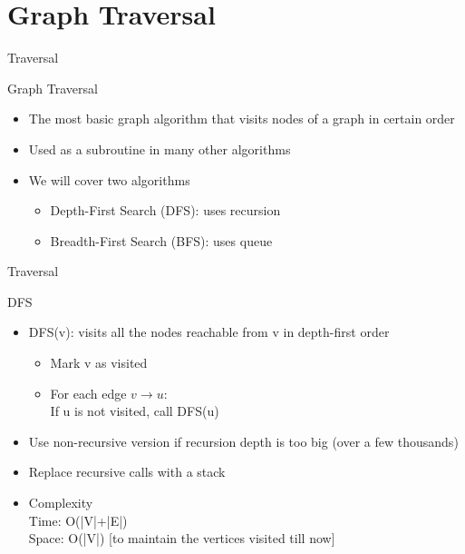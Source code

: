 \documentclass{beamer}
\begin{document}
\section{Graph Traversal}
\begin{frame}[<+->]{Traversal}
\begin{block}{Graph Traversal}
  \begin{itemize}
    \item The most basic graph algorithm that visits nodes of a graph in certain order
    \item Used as a subroutine in many other algorithms
    \item We will cover two algorithms\\
      \begin{itemize}
	\item Depth-First Search (DFS): uses recursion
	\item Breadth-First Search (BFS): uses queue
      \end{itemize}
  \end{itemize}
\end{block}
\end{frame}

\begin{frame}[<+->]{Traversal}
\begin{block}{DFS}
  \begin{itemize}
    \item DFS(v): visits all the nodes reachable from v in depth-first order\\
      \begin{itemize}
      \item Mark v as visited
      \item For each edge $v \rightarrow u$:\\
	\hspace{3mm} If u is not visited, call DFS(u)
      \end{itemize}
    \item Use non-recursive version if recursion depth is too big (over a few thousands)
    \item Replace recursive calls with a stack
    \item Complexity\\
      \pause\hspace{2mm} Time: O(|V|+|E|)\\
      \pause\hspace{2mm} Space: O(|V|) [to maintain the vertices visited till now]
  \end{itemize}
\end{block}
\end{frame}
\end{document}
